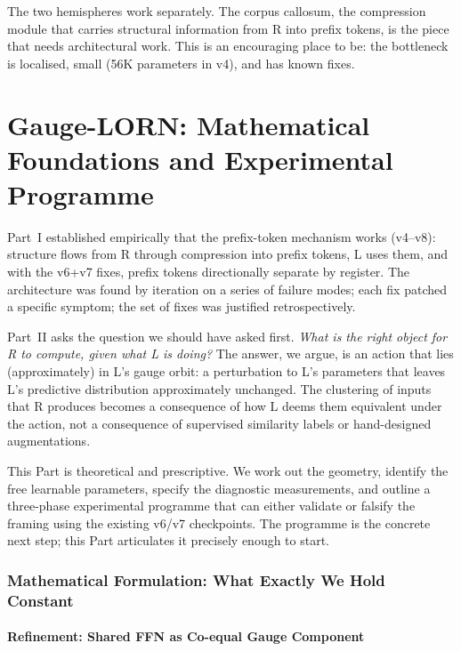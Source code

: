 \documentclass[11pt, a4paper]{article}
\theoremstyle{plain}
\theoremstyle{definition}
\theoremstyle{remark}
\begin{document}
The two hemispheres work separately.
The corpus callosum, the compression module that carries structural information from R into prefix tokens, is the piece that needs architectural work.
This is an encouraging place to be: the bottleneck is localised, small (56K parameters in v4), and has known fixes.


\part{Gauge-LORN: Mathematical Foundations and Experimental Programme}

Part~I established empirically that the prefix-token mechanism works (v4--v8): structure flows from R through compression into prefix tokens, L uses them, and with the v6+v7 fixes, prefix tokens directionally separate by register.
The architecture was found by iteration on a series of failure modes; each fix patched a specific symptom; the set of fixes was justified retrospectively.

Part~II asks the question we should have asked first.
\emph{What is the right object for R to compute, given what L is doing?}
The answer, we argue, is an action that lies (approximately) in L's gauge orbit: a perturbation to L's parameters that leaves L's predictive distribution approximately unchanged.
The clustering of inputs that R produces becomes a consequence of how L deems them equivalent under the action, not a consequence of supervised similarity labels or hand-designed augmentations.

This Part is theoretical and prescriptive.
We work out the geometry, identify the free learnable parameters, specify the diagnostic measurements, and outline a three-phase experimental programme that can either validate or falsify the framing using the existing v6/v7 checkpoints.
The programme is the concrete next step; this Part articulates it precisely enough to start.


\section{Mathematical Formulation: What Exactly We Hold Constant}
\label{sec:invariant}

\subsection{Refinement: Shared FFN as Co-equal Gauge Component}
\label{sec:shared-ffn-gauge}
\end{document}
